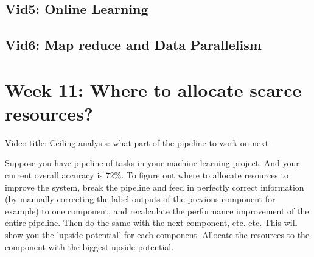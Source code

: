 \documentclass[fontsize=11]{article}
\begin{document}
\subsection{Vid5: Online Learning}

\subsection{Vid6: Map reduce and Data Parallelism}

\section{Week 11: Where to allocate scarce resources?}
Video title: Ceiling analysis: what part of the pipeline to work on next

Suppose you have pipeline of tasks in your machine learning project. And your current overall accuracy is 72\%. To figure out where to allocate resources to improve the system, break the pipeline and feed in perfectly correct information (by manually correcting the label outputs of the previous component for example) to one component, and recalculate the performance improvement of the entire pipeline. Then do the same with the next component, etc. etc. This will show you the 'upside potential' for each component. Allocate the resources to the component with the biggest upside potential.
\end{document}
